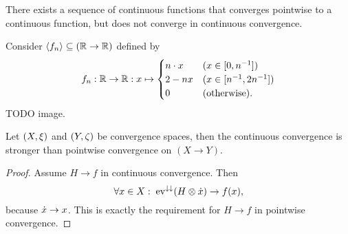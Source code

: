 \begin{example}
There exists a sequence of continuous functions that converges pointwise to a continuous function, but does not converge in continuous convergence.

Consider $\left\langle f_n \right\rangle \subseteq (\mathbb{R}\to\mathbb{R})$ defined by
\[ f_n: \R\to\R: x\mapsto \begin{cases}
n\cdot x & (x\in \interval{0,n^{-1}}) \\
2 - nx & (x\in \interval{n^{-1}, 2n^{-1}}) \\
0 & (\text{otherwise}).
\end{cases} \]
TODO image.
\end{example}

\begin{lemma} \label{strengthContinuousPointwiseConvergence}
Let $\sSet{X,\xi}$ and $\sSet{Y,\zeta}$ be convergence spaces, then the continuous convergence is stronger than pointwise convergence on $(X\to Y)$.
\end{lemma}
\begin{proof}
Assume $H\to f$ in continuous convergence. Then
\[ \forall x\in X: \; \operatorname{ev}^{\downarrow\downarrow}(H\otimes \dot{x}) \to f(x), \]
because $\dot{x}\to x$. This is exactly the requirement for $H\to f$ in pointwise convergence.
\end{proof}


